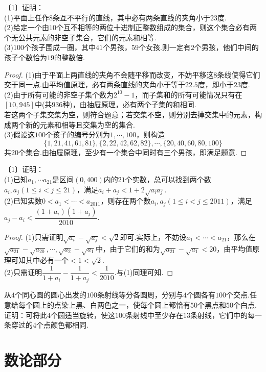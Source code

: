 \documentclass[lang=cn, zihao=4.5]{elegantbook}
\newcommand{\nd}[1]{〔#1〕}
\begin{document}
\begin{example} %
	\nd{1}证明： \\
	(1)平面上任作$8$条互不平行的直线，其中必有两条直线的夹角小于$23$度. \\
	(2)给定一个由$10$个互不相等的两位十进制正整数组成的集合，则这个集合必有两个无公共元素的非空子集合，它们的元素和相等. \\
	(3)$100$个孩子围成一圈，其中$41$个男孩，$59$个女孩.则一定有$2$个男孩，他们中间的孩子个数恰为$19$的整数倍.
\end{example}
\begin{proof}
	(1)由于平面上两直线的夹角不会随平移而改变，不妨平移这$8$条线使得它们交于同一点.由平均值原理，必有两条直线的夹角小于等于$22.5$度，即小于$23$度. \\
	(2)由于所有可能的非空子集个数为$2^{10}-1$，而子集和的所有可能情况只有在$[10,945]$中(共$936$种)，由抽屉原理，必有两个子集的和相同. \\
	若这两个子集交集为空，则符合题意；若交集不空，则分别去掉交集中的元素，构成两个新的元素和相等且交集为空的集合. \\
	(3)假设这$100$个孩子的编号分别为$1, \cdots ,100$，则构造$$\{ 1,21,41,61,81 \}, \{ 2,22,42,62,82 \}, \cdots ,\{ 20,40,60,80,100 \}$$
	共$20$个集合.由抽屉原理，至少有一个集合中同时有三个男孩，即满足题意.
\end{proof}

\begin{example} %
	\nd{1}证明： \\
	(1)已知$a_1, \cdots a_{21}$是区间$(0,400)$内的$21$个实数，总可以找到两个数$a_i,a_j(1 \leq i < j \leq 21)$，满足$a_i+a_j < 1+2\sqrt{a_ia_j}$. \\
	(2)已知实数$0<a_1 < \cdots < a_{2011}$，则存在两个数$a_i,a_j(1 \leq i < j \leq 2011)$，满足$a_j-a_i < \dfrac{(1+a_i)(1+a_j)}{2010}$.
\end{example}
\begin{proof}
	(1)只需证明$\sqrt{a_i}-\sqrt{a_j}<\sqrt{2}$即可.实际上，不妨设$a_1<\cdots <a_{21}$，那么在$\sqrt{a_{21}}-\sqrt{a_{20}}, \cdots ,\sqrt{a_2}-\sqrt{a_1}$中，由于它们的和为$\sqrt{a_{21}}-\sqrt{a_1} < 20$，由平均值原理可知其中必有一个$<1<\sqrt{2}$. \\
	(2)只需证明$\dfrac{1}{1+a_i}-\dfrac{1}{1+a_j} < \dfrac{1}{2010}$.与(1)同理可知.
\end{proof}

\begin{example}
	从$4$个同心圆的圆心出发的$100$条射线等分各圆周，分别与$4$个圆各有$100$个交点.任意给每个圆上的点染上黑、白两色之一，使每个圆上都恰有$50$个黑点和$50$个白点.证明：可将此$4$个圆适当旋转，使这$100$条射线中至少存在$13$条射线，它们中的每一条穿过的$4$个点颜色都相同.
\end{example}

\part{数论部分}
\end{document}
